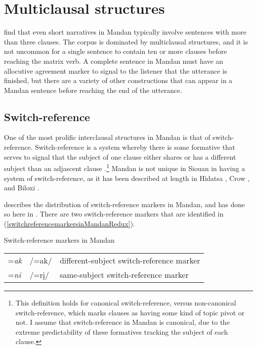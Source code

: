 \section{Multiclausal structures}\label{Ch5Multiclausal}

\citet{carmodykasak2023} find that even short narratives in Mandan typically involve sentences with more than three clauses. The corpus is dominated by multiclausal structures, and it is not uncommon for a single sentence to contain ten or more clauses before reaching the matrix verb. A complete sentence in Mandan must have an allocutive agreement marker to signal to the listener that the utterance is finished, but there are a variety of other constructions that can appear in a Mandan sentence before reaching the end of the utterance.


\subsection{Switch-reference}\label{Ch5switchreference}

One of the most prolific interclausal structures in Mandan is that of switch-reference. Switch-reference is a system whereby there is some formative that serves to signal that the subject of one clause either shares or has a different subject than an adjascent clause \citep[ix]{haimanmunro1983}.\footnote{This definition holds for canonical switch-reference, versus non-canonical switch-reference, which marks clauses as having some kind of topic pivot or not. I assume that switch-reference in Mandan is canonical, due to the extreme predictability of these formatives tracking the subject of each clause.} Mandan is not unique in Siouan in having a system of switch-reference, as it has been described at length in Hidatsa \citep{boyle2007,boyle2011}, Crow \citep{graczyk2007}, and Biloxi \citep{graczyk1997,torres2010}.

\citet{kasak2019} describes the distribution of switch-reference markers in Mandan, and has done so here in . There are two switch-reference markers that are identified in (\ref{switchreferencemarkersinMandanRedux}).



\begin{exe}

\item\label{switchreferencemarkersinMandanRedux} Switch-reference markers in Mandan

\begin{tabular}{lll}
	
	{=\textit{ak}}& /=ak/ & different-subject switch-reference marker\\
	{=\textit{ni}}&/=rį/	&	same-subject switch-reference marker\\

\end{tabular}

\end{exe}

